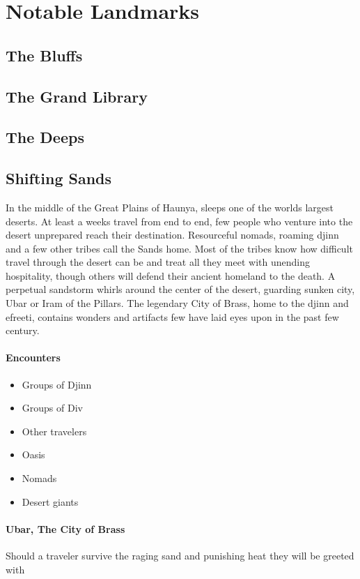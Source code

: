 	\section{Notable Landmarks}

		\subsection{The Bluffs}

		\subsection{The Grand Library}

		\subsection{The Deeps}

		\subsection{Shifting Sands}

			In the middle of the Great Plains of Haunya, sleeps one of the
			worlds largest deserts. At least a weeks travel from end to end,
			few people who venture into the desert unprepared reach their
			destination.  Resourceful nomads, roaming djinn and a few other
			tribes call the Sands home.  Most of the tribes know how difficult
			travel through the desert can be and treat all they meet with
			unending hospitality, though others will defend their ancient
			homeland to the death.  A perpetual sandstorm whirls around the
			center of the desert, guarding sunken city, Ubar or Iram of the
			Pillars.  The legendary City of Brass, home to the djinn and
			efreeti, contains wonders and artifacts few have laid eyes upon
			in the past few century.

			\paragraph{Encounters}
				\begin{itemize}
					\item Groups of Djinn
					\item Groups of Div
					\item Other travelers
					\item Oasis
					\item Nomads
					\item Desert giants
				\end{itemize}

			\paragraph{Ubar, The City of Brass}
				
				Should a traveler survive the raging sand and punishing heat they will 
				be greeted with 
